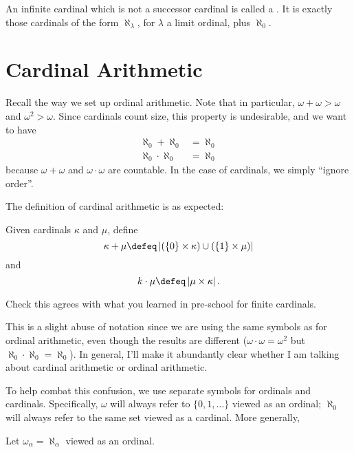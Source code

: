 \begin{definition}
	An infinite cardinal which is not a successor cardinal
	is called a .
	It is exactly those cardinals of the form $\aleph_\lambda$,
	for $\lambda$ a limit ordinal, plus $\aleph_0$.
\end{definition}


\section{Cardinal Arithmetic}
Recall the way we set up ordinal arithmetic.
Note that in particular, $\omega + \omega > \omega$ and $\omega^2 > \omega$.
Since cardinals count size, this property is undesirable, and
we want to have
\begin{align*}
	\aleph_0 + \aleph_0 &= \aleph_0 \\
	\aleph_0 \cdot \aleph_0 &= \aleph_0
\end{align*}
because $\omega + \omega$ and $\omega \cdot \omega$ are countable.
In the case of cardinals, we simply ``ignore order''.

The definition of cardinal arithmetic is as expected:
\begin{definition}
	Given cardinals $\kappa$ and $\mu$, define
	\[ \kappa + \mu
		\defeq
		\left\lvert 
		\left( \left\{ 0 \right\} \times \kappa \right)
		\cup
		\left( \left\{ 1 \right\} \times \mu \right)
		\right\rvert
	\]
	and
	\[
		k \cdot \mu
		\defeq
		\left\lvert \mu \times \kappa \right\rvert
		.
	\]
\end{definition}


\begin{ques}
	Check this agrees with what you learned in pre-school
	for finite cardinals.
\end{ques}

\begin{abuse}
	This is a slight abuse of notation since we are using
	the same symbols as for ordinal arithmetic,
	even though the results are different ($\omega \cdot \omega = \omega^2$
	but $\aleph_0 \cdot \aleph_0 = \aleph_0$).
	In general, I'll make it abundantly clear whether I am talking
	about cardinal arithmetic or ordinal arithmetic.
\end{abuse}
To help combat this confusion, we use separate symbols for ordinals and cardinals.
Specifically, $\omega$ will always refer to $\{0,1,\dots\}$ viewed as an ordinal;
$\aleph_0$ will always refer to the same set viewed as a cardinal.
More generally,
\begin{definition}
	Let $\omega_\alpha = \aleph_\alpha$ viewed as an ordinal.
\end{definition}

